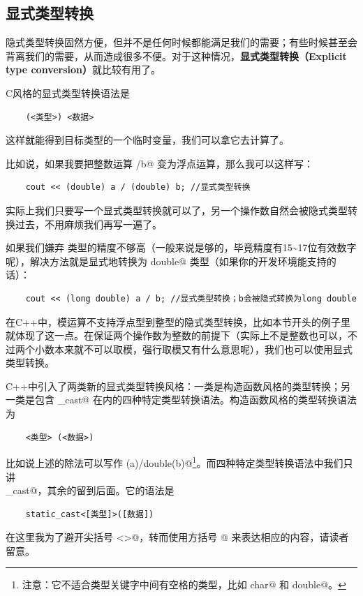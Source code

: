 \subsection*{显式类型转换}
隐式类型转换固然方便，但并不是任何时候都能满足我们的需要；有些时候甚至会背离我们的需要，从而造成很多不便。对于这种情况，\textbf{显式类型转换（Explicit type conversion）}就比较有用了。\par
C风格的显式类型转换语法是
\begin{lstlisting}
    (<类型>) <数据>
\end{lstlisting}
这样就能得到目标类型的一个临时变量，我们可以拿它去计算了。\par
比如说，如果我要把整数运算 \lstinline@a/b@ 变为浮点运算，那么我可以这样写：
\begin{lstlisting}
    cout << (double) a / (double) b; //显式类型转换
\end{lstlisting}
实际上我们只要写一个显式类型转换就可以了，另一个操作数自然会被隐式类型转换过去，不用麻烦我们再写一遍了。\par
如果我们嫌弃 \lstinline@double@ 类型的精度不够高（一般来说是够的，毕竟精度有15\~{}17位有效数字呢），解决方法就是显式地转换为 \lstinline@long double@ 类型（如果你的开发环境能支持的话）：
\begin{lstlisting}
    cout << (long double) a / b; //显式类型转换；b会被隐式转换为long double
\end{lstlisting}\par
在C++中，模运算不支持浮点型到整型的隐式类型转换，比如本节开头的例子里就体现了这一点。在保证两个操作数为整数的前提下（实际上不是整数也可以，不过两个小数本来就不可以取模，强行取模又有什么意思呢），我们也可以使用显式类型转换。\par
C++中引入了两类新的显式类型转换风格：一类是构造函数风格的类型转换；另一类是包含 \lstinline@static_cast@ 在内的四种特定类型转换语法。构造函数风格的类型转换语法为
\begin{lstlisting}
    <类型> (<数据>)
\end{lstlisting}
比如说上述的除法可以写作 \lstinline@double(a)/double(b)@\footnote{注意：它不适合类型关键字中间有空格的类型，比如 \lstinline@unsigned char@ 和 \lstinline@long  double@。}。而四种特定类型转换语法中我们只讲\\\lstinline@static_cast@，其余的留到后面。它的语法是
\begin{lstlisting}
    static_cast<[类型]>([数据])
\end{lstlisting}
在这里我为了避开尖括号 \lstinline@<>@，转而使用方括号 \lstinline@[]@ 来表达相应的内容，请读者留意。\par
